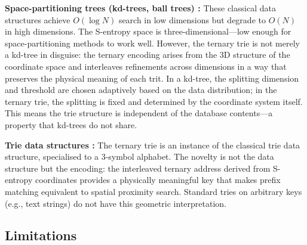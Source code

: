 \documentclass[11pt,a4paper]{article}
\theoremstyle{definition}
\theoremstyle{remark}
\begin{document}
\textbf{Space-partitioning trees (kd-trees, ball trees) \citep{knuth1998}:} These classical data structures achieve $O(\log N)$ search in low dimensions but degrade to $O(N)$ in high dimensions. The S-entropy space is three-dimensional---low enough for space-partitioning methods to work well. However, the ternary trie is not merely a kd-tree in disguise: the ternary encoding arises from the 3D structure of the coordinate space and interleaves refinements across dimensions in a way that preserves the physical meaning of each trit. In a kd-tree, the splitting dimension and threshold are chosen adaptively based on the data distribution; in the ternary trie, the splitting is fixed and determined by the coordinate system itself. This means the trie structure is independent of the database contents---a property that kd-trees do not share.

\textbf{Trie data structures \citep{fredkin1960}:} The ternary trie is an instance of the classical trie data structure, specialised to a 3-symbol alphabet. The novelty is not the data structure but the encoding: the interleaved ternary address derived from S-entropy coordinates provides a physically meaningful key that makes prefix matching equivalent to spatial proximity search. Standard tries on arbitrary keys (e.g., text strings) do not have this geometric interpretation.

\subsection{Limitations}
\end{document}
